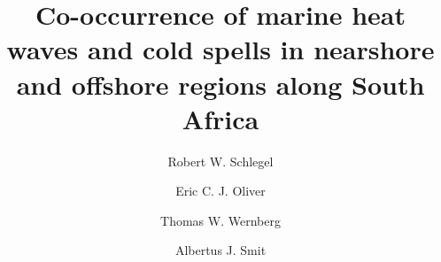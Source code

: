 \documentclass[a4paper,10pt,review]{elsarticle}
\begin{document}
\begin{frontmatter}

\title{Co-occurrence of marine heat waves and cold spells in nearshore and offshore regions along South Africa}

\author[firstaddress]{Robert W. Schlegel}

\author[secondaddress,thirdaddress]{Eric C. J. Oliver}
\author[fourthaddress]{Thomas W. Wernberg}
\author[firstaddress]{Albertus J. Smit}


\address[firstaddress]{Department of Biodiversity and Conservation Biology, University of the Western Cape, Private Bag X17, Bellville 7535, South Africa}

\address[secondaddress]{ARC Centre of Excellence for Climate System Science, The University of New South Wales, Sydney, Australia}

\address[thirdaddress]{Institute for Marine and Antarctic Studies, University of Tasmania, Hobart, Australia}

\address[fourthaddress]{UWA Oceans Institute and School of Plant Biology, The University of Western Australia, Crawley, 6009 Western Australia, Australia}


\end{frontmatter}
\end{document}
